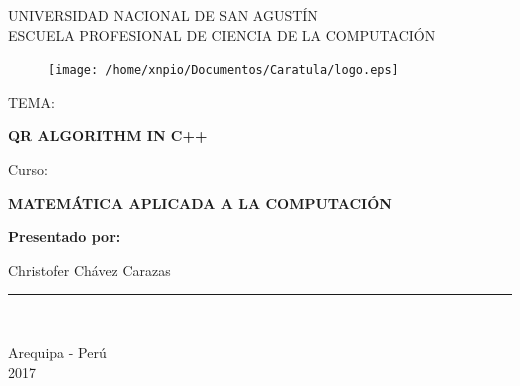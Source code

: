 \documentclass[a4paper,12pt]{article}
\begin{document}
\begin{titlepage}

\begin{center}
\vspace*{-1in}

\begin{large}
UNIVERSIDAD NACIONAL DE SAN AGUSTÍN\\
\vspace*{0.15in}
ESCUELA PROFESIONAL DE CIENCIA DE LA COMPUTACIÓN\\
\end{large}
\begin{figure}[htb]
\centering
\texttt{[image: /home/xnpio/Documentos/Caratula/logo.eps]}
\end{figure}
\vspace*{0.15in}
\begin{large}
TEMA:\\
\end{large}
\vspace*{0.2in}
\begin{Large}
\textbf{QR ALGORITHM IN C++} \\
\end{Large}
\vspace{8mm}

\begin{large}
Curso:\\
\end{large}
\vspace*{0.2in}
\begin{Large}
\textbf{MATEMÁTICA APLICADA A LA COMPUTACIÓN} \\
\end{Large}

\vspace{8mm}

\begin{large}
\textbf{Presentado por:}\\

\begin{flushleft}

\hspace{7cm} Christofer Chávez Carazas \\

\end{flushleft}
\end{large}
\vspace{4cm}
\rule{80mm}{0.1mm}\\
\vspace*{0.1in}

\begin{large}
Arequipa - Perú \\
2017 \\
\end{large}
\end{center}
\end{titlepage}
\end{document}

